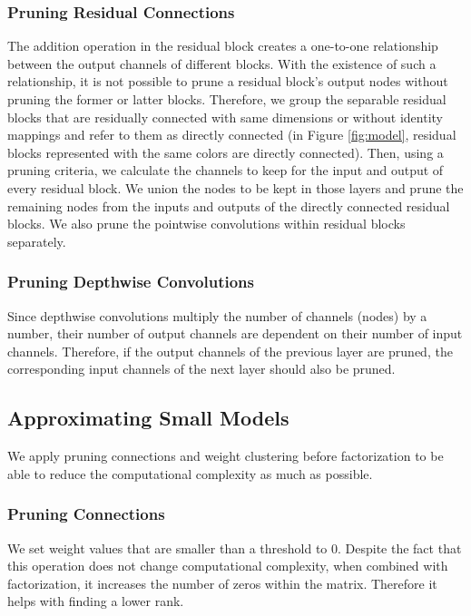 \subsubsection{Pruning Residual Connections}
The addition operation in the residual block creates a one-to-one relationship between the output channels of different blocks. With the existence of such a relationship, it is not possible to prune a residual block's output nodes without pruning the former or latter blocks. Therefore, we group the separable residual blocks that are residually connected with same dimensions or without identity mappings and refer to them as directly connected (in Figure \ref{fig:model}, residual blocks represented with the same colors are directly connected). Then, using a pruning criteria, we calculate the channels to keep for the input and output of every residual block. We union the nodes to be kept in those layers and prune the remaining nodes from the inputs and outputs of the directly connected residual blocks. We also prune the pointwise convolutions within residual blocks separately. 

\subsubsection{Pruning Depthwise Convolutions}
Since depthwise convolutions multiply the number of channels (nodes) by a number, their number of output channels are dependent on their number of input channels. Therefore, if the output channels of the previous layer are pruned, the corresponding input channels of the next layer should also be pruned.

\subsection{Approximating Small Models}
\label{sec:factorization}
We apply pruning connections and weight clustering before factorization to be able to reduce the computational complexity as much as possible.

\subsubsection{Pruning Connections}
We set weight values that are smaller than a threshold to 0. Despite the fact that this operation does not change computational complexity, when combined with factorization, it increases the number of zeros within the matrix. Therefore it helps with finding a lower rank.

